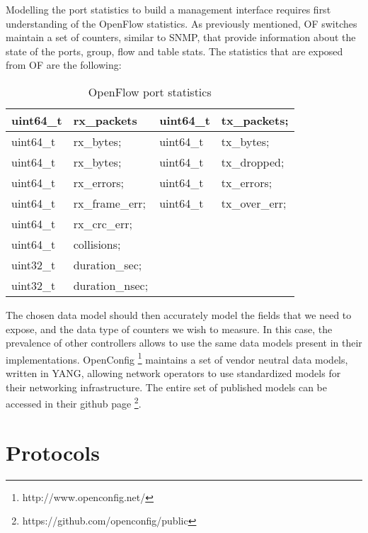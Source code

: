 \par Modelling the port statistics to build a management interface requires first understanding of the OpenFlow statistics. As previously mentioned, OF switches maintain a set of counters, similar to SNMP, that provide information 
about the state of the ports, group, flow and table stats. The statistics that are exposed from OF are the following:

\begin{table}[]
    \centering
    \caption{OpenFlow port statistics}
    \label{my-label}
    \begin{tabular}{l | l || l | l}
       uint64\_t & rx\_packets     & uint64\_t & tx\_packets;     \\ \hline
       uint64\_t & rx\_bytes;      & uint64\_t & tx\_bytes;       \\ \hline
       uint64\_t & rx\_bytes;      & uint64\_t & tx\_dropped;     \\ \hline
       uint64\_t & rx\_errors;     & uint64\_t & tx\_errors;      \\ \hline
       uint64\_t & rx\_frame\_err; & uint64\_t & tx\_over\_err;   \\ \hline
       uint64\_t & rx\_crc\_err;   &                              \\ \hline
       uint64\_t & collisions;     &                              \\ \hline
       uint32\_t & duration\_sec;  &                              \\ \hline
       uint32\_t & duration\_nsec; &                 
    \end{tabular}
\end{table}

\par The chosen data model should then accurately model the fields that we need to expose, and the data type of counters we wish to measure. In this case, the prevalence of other controllers allows to use the same data models present 
in their implementations. OpenConfig \footnote{http://www.openconfig.net/} maintains a set of vendor neutral data models, written in YANG, allowing network operators to use standardized models for their networking infrastructure.
The entire set of published models can be accessed in their github page \footnote {https://github.com/openconfig/public}.

\section {Protocols}

